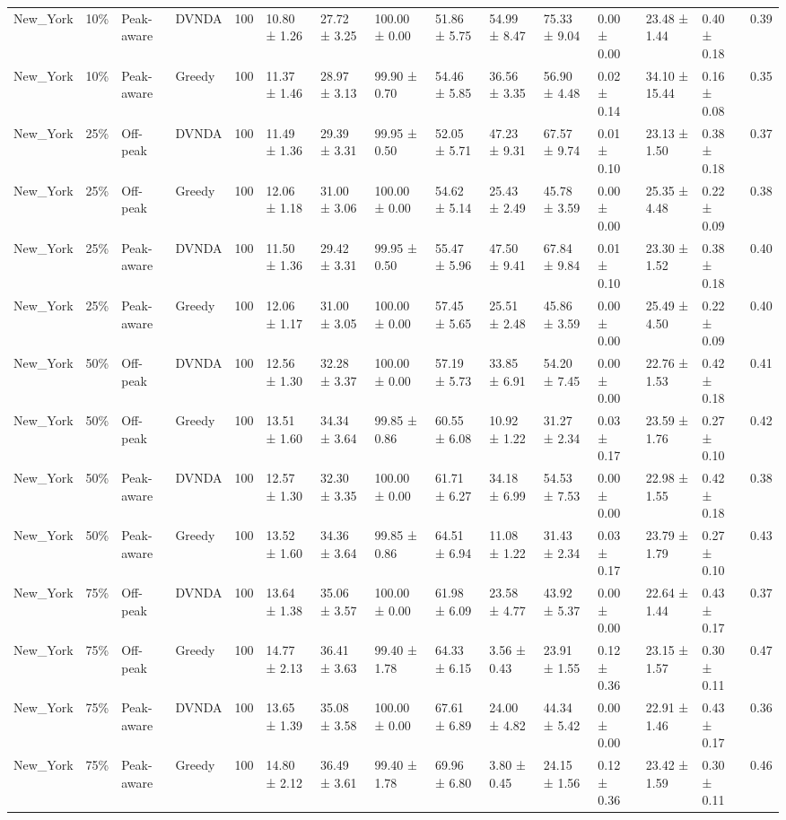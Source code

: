 \begin{tabular}{lllllllllllllll}
New\_York & 10\% & Peak-aware & DVNDA & 100 & 10.80 ± 1.26 & 27.72 ± 3.25 & 100.00 ± 0.00 & 51.86 ± 5.75 & 54.99 ± 8.47 & 75.33 ± 9.04 & 0.00 ± 0.00 & 23.48 ± 1.44 & 0.40 ± 0.18 & 0.39 \\
New\_York & 10\% & Peak-aware & Greedy & 100 & 11.37 ± 1.46 & 28.97 ± 3.13 & 99.90 ± 0.70 & 54.46 ± 5.85 & 36.56 ± 3.35 & 56.90 ± 4.48 & 0.02 ± 0.14 & 34.10 ± 15.44 & 0.16 ± 0.08 & 0.35 \\
New\_York & 25\% & Off-peak & DVNDA & 100 & 11.49 ± 1.36 & 29.39 ± 3.31 & 99.95 ± 0.50 & 52.05 ± 5.71 & 47.23 ± 9.31 & 67.57 ± 9.74 & 0.01 ± 0.10 & 23.13 ± 1.50 & 0.38 ± 0.18 & 0.37 \\
New\_York & 25\% & Off-peak & Greedy & 100 & 12.06 ± 1.18 & 31.00 ± 3.06 & 100.00 ± 0.00 & 54.62 ± 5.14 & 25.43 ± 2.49 & 45.78 ± 3.59 & 0.00 ± 0.00 & 25.35 ± 4.48 & 0.22 ± 0.09 & 0.38 \\
New\_York & 25\% & Peak-aware & DVNDA & 100 & 11.50 ± 1.36 & 29.42 ± 3.31 & 99.95 ± 0.50 & 55.47 ± 5.96 & 47.50 ± 9.41 & 67.84 ± 9.84 & 0.01 ± 0.10 & 23.30 ± 1.52 & 0.38 ± 0.18 & 0.40 \\
New\_York & 25\% & Peak-aware & Greedy & 100 & 12.06 ± 1.17 & 31.00 ± 3.05 & 100.00 ± 0.00 & 57.45 ± 5.65 & 25.51 ± 2.48 & 45.86 ± 3.59 & 0.00 ± 0.00 & 25.49 ± 4.50 & 0.22 ± 0.09 & 0.40 \\
New\_York & 50\% & Off-peak & DVNDA & 100 & 12.56 ± 1.30 & 32.28 ± 3.37 & 100.00 ± 0.00 & 57.19 ± 5.73 & 33.85 ± 6.91 & 54.20 ± 7.45 & 0.00 ± 0.00 & 22.76 ± 1.53 & 0.42 ± 0.18 & 0.41 \\
New\_York & 50\% & Off-peak & Greedy & 100 & 13.51 ± 1.60 & 34.34 ± 3.64 & 99.85 ± 0.86 & 60.55 ± 6.08 & 10.92 ± 1.22 & 31.27 ± 2.34 & 0.03 ± 0.17 & 23.59 ± 1.76 & 0.27 ± 0.10 & 0.42 \\
New\_York & 50\% & Peak-aware & DVNDA & 100 & 12.57 ± 1.30 & 32.30 ± 3.35 & 100.00 ± 0.00 & 61.71 ± 6.27 & 34.18 ± 6.99 & 54.53 ± 7.53 & 0.00 ± 0.00 & 22.98 ± 1.55 & 0.42 ± 0.18 & 0.38 \\
New\_York & 50\% & Peak-aware & Greedy & 100 & 13.52 ± 1.60 & 34.36 ± 3.64 & 99.85 ± 0.86 & 64.51 ± 6.94 & 11.08 ± 1.22 & 31.43 ± 2.34 & 0.03 ± 0.17 & 23.79 ± 1.79 & 0.27 ± 0.10 & 0.43 \\
New\_York & 75\% & Off-peak & DVNDA & 100 & 13.64 ± 1.38 & 35.06 ± 3.57 & 100.00 ± 0.00 & 61.98 ± 6.09 & 23.58 ± 4.77 & 43.92 ± 5.37 & 0.00 ± 0.00 & 22.64 ± 1.44 & 0.43 ± 0.17 & 0.37 \\
New\_York & 75\% & Off-peak & Greedy & 100 & 14.77 ± 2.13 & 36.41 ± 3.63 & 99.40 ± 1.78 & 64.33 ± 6.15 & 3.56 ± 0.43 & 23.91 ± 1.55 & 0.12 ± 0.36 & 23.15 ± 1.57 & 0.30 ± 0.11 & 0.47 \\
New\_York & 75\% & Peak-aware & DVNDA & 100 & 13.65 ± 1.39 & 35.08 ± 3.58 & 100.00 ± 0.00 & 67.61 ± 6.89 & 24.00 ± 4.82 & 44.34 ± 5.42 & 0.00 ± 0.00 & 22.91 ± 1.46 & 0.43 ± 0.17 & 0.36 \\
New\_York & 75\% & Peak-aware & Greedy & 100 & 14.80 ± 2.12 & 36.49 ± 3.61 & 99.40 ± 1.78 & 69.96 ± 6.80 & 3.80 ± 0.45 & 24.15 ± 1.56 & 0.12 ± 0.36 & 23.42 ± 1.59 & 0.30 ± 0.11 & 0.46 \\
\hline
\end{tabular}
